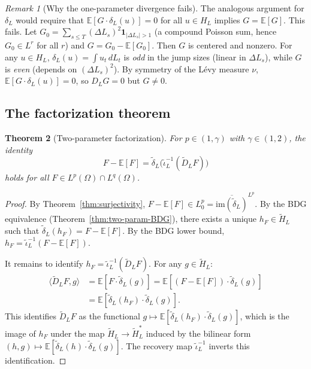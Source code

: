 \documentclass[11pt,a4paper]{article}
\theoremstyle{plain}
\newtheorem{theorem}{Theorem}[section]
\theoremstyle{definition}
\theoremstyle{remark}
\newtheorem{remark}[theorem]{Remark}
\newcommand{\E}{\mathbb{E}}
\newcommand{\im}{\mathrm{im}}
\begin{document}
\begin{remark}[Why the one-parameter divergence fails]
\label{rem:one-param-fails}
The analogous argument for $\delta_L$ would require
that $\E[G \cdot \delta_L(u)] = 0$ for all
$u \in H_L$ implies $G = \E[G]$.  This fails.
Let $G_0 = \sum_{s\leq T}(\Delta L_s)^2
\mathbf{1}_{|\Delta L_s|>1}$
(a compound Poisson sum, hence $G_0 \in L^r$ for all $r$)
and $G = G_0 - \E[G_0]$.  Then $G$ is centered and nonzero.
For any $u \in H_L$, $\delta_L(u) = \int u_t\,dL_t$ is
\emph{odd} in the jump sizes (linear in $\Delta L_s$),
while $G$ is \emph{even} (depends on $(\Delta L_s)^2$).
By symmetry of the L\'evy measure $\nu$,
$\E[G\cdot\delta_L(u)] = 0$, so $D_L G = 0$ but
$G \neq 0$.
\end{remark}


\subsection{The factorization theorem}

\begin{theorem}[Two-parameter factorization]
\label{thm:two-param-factorization}
For $p \in (1,\gamma)$ with $\gamma \in (1,2)$, the identity
\begin{equation}\label{eq:two-param-fact}
  F - \E[F]
  = \widetilde{\delta}_L\bigl(
  \widetilde{\iota}_L^{-1}(\widetilde{D}_L F)\bigr)
\end{equation}
holds for all $F \in L^p(\Omega) \cap L^q(\Omega)$.
\end{theorem}

\begin{proof}
By Theorem~\ref{thm:surjectivity}, $F - \E[F] \in L^p_0
= \overline{\im(\widetilde{\delta}_L)}^{L^p}$.  By the
BDG equivalence (Theorem~\ref{thm:two-param-BDG}), there
exists a unique $h_F \in \widetilde{H}_L$ such that
$\widetilde{\delta}_L(h_F) = F - \E[F]$.  By the BDG lower
bound, $h_F = \widetilde{\iota}_L^{-1}(F - \E[F])$.

It remains to identify
$h_F = \widetilde{\iota}_L^{-1}(\widetilde{D}_L F)$.
For any $g \in \widetilde{H}_L$:
\begin{align*}
  \langle \widetilde{D}_L F, g \rangle
  &= \E[F \cdot \widetilde{\delta}_L(g)]
  = \E[(F - \E[F]) \cdot \widetilde{\delta}_L(g)]\\
  &= \E[\widetilde{\delta}_L(h_F) \cdot
  \widetilde{\delta}_L(g)].
\end{align*}
This identifies $\widetilde{D}_L F$ as the functional
$g \mapsto \E[\widetilde{\delta}_L(h_F)\cdot
\widetilde{\delta}_L(g)]$, which is the image of $h_F$
under the map $\widetilde{H}_L \to \widetilde{H}_L^*$
induced by the bilinear form
$(h, g) \mapsto \E[\widetilde{\delta}_L(h)\cdot
\widetilde{\delta}_L(g)]$.  The recovery map
$\widetilde{\iota}_L^{-1}$ inverts this identification.
\end{proof}
\end{document}
